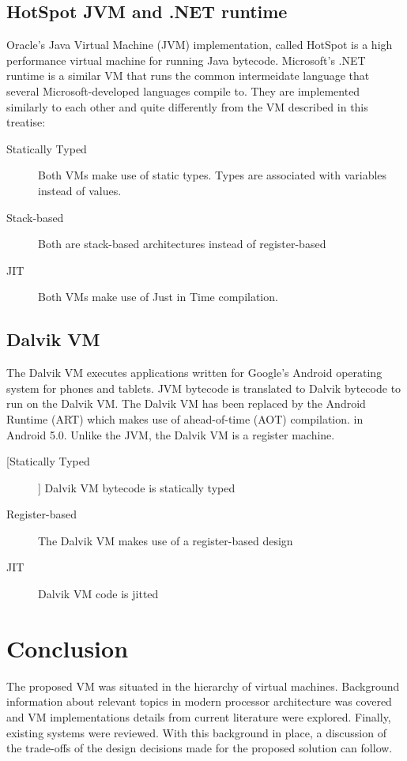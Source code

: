 \documentclass[english,a4paper,12pt]{report}
\begin{document}
\subsection{HotSpot JVM and .NET runtime}
Oracle's Java Virtual Machine (JVM) implementation, called HotSpot is a
high performance virtual machine for running Java
bytecode. Microsoft's .NET runtime is a similar VM that runs the
common intermeidate language that several Microsoft-developed
languages compile to. They are implemented similarly to each other and
quite differently from the VM described in this treatise:
\begin{description}
\item[Statically Typed] Both VMs make use of static types. Types are
  associated with variables instead of values.
\item[Stack-based] Both are stack-based architectures instead of
  register-based
\item[JIT] Both VMs make use of Just in Time compilation.
\end{description}

\subsection{Dalvik VM}
The Dalvik VM executes applications written for Google's Android
operating system for phones and tablets. JVM bytecode is translated to
Dalvik bytecode to run on the Dalvik VM. The Dalvik VM has been
replaced by the Android Runtime (ART) which makes use of ahead-of-time
(AOT) compilation. in Android 5.0. Unlike the JVM, the Dalvik VM is a
register machine.
\begin{description}
\item[[Statically Typed]] Dalvik VM bytecode is statically typed
\item[Register-based] The Dalvik VM makes use of a register-based
  design
\item[JIT] Dalvik VM code is jitted
\end{description}

\section{Conclusion}
The proposed VM was situated in the hierarchy of virtual
machines. Background information about relevant topics in modern
processor architecture was covered and VM implementations details from
current literature were explored. Finally, existing systems were
reviewed. With this background in place, a discussion of the
trade-offs of the design decisions made for the proposed solution can
follow.
\end{document}
